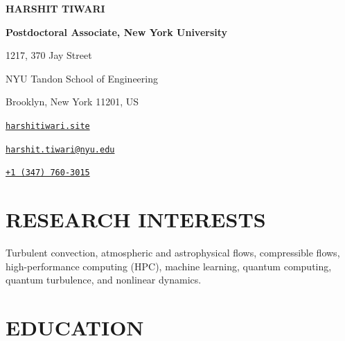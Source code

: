 \documentclass[10pt,a4paper]{article}
\begin{document}
\thispagestyle{firstpage}

\noindent
\begin{minipage}[b]{0.55\textwidth}
\setlength{\parindent}{0pt}%
{\Huge\bfseries\color{cvblue}HARSHIT TIWARI}\par
\vspace{0.5ex}
{\large\bfseries\color{cvblue}Postdoctoral Associate, New York University}\par
\vspace{1ex}
\textcolor{cvdark}{1217, 370 Jay Street}\par
\textcolor{cvdark}{NYU Tandon School of Engineering}\par
\textcolor{cvdark}{Brooklyn, New York 11201, US}
\end{minipage}%
\begin{minipage}[b]{0.45\textwidth}
\setlength{\parindent}{0pt}%
\raggedleft
\href{https://harshitiwari.site}{\texttt{harshitiwari.site} \textcolor{cvblue}{\faGlobe}}\par
\vspace{0.5ex}
\href{mailto:harshit.tiwari@nyu.edu}{\texttt{harshit.tiwari@nyu.edu} \textcolor{cvblue}{\faEnvelope}}\par
\vspace{0.5ex}
\href{tel:+13477603015}{\texttt{+1 (347) 760-3015} \textcolor{cvblue}{\faPhone}}\par
\vspace{1ex}
\href{https://scholar.google.com/citations?user=pZsezWMAAAAJ}{\textcolor{cvblue}{\Large\faGraduationCap}} \quad
\href{https://www.researchgate.net/profile/Harshit-Tiwari-7/}{\textcolor{cvblue}{\Large\faResearchgate}} \quad
\href{https://orcid.org/0009-0002-0116-9476}{\textcolor{cvblue}{\Large\faOrcid}} \quad
\href{https://www.linkedin.com/in/harshit-tiwari-6989b216b}{\textcolor{cvblue}{\Large\faLinkedin}}
\end{minipage}

\vspace{1ex}

\section{RESEARCH INTERESTS}
Turbulent convection, atmospheric and astrophysical flows, compressible flows, high-performance computing (HPC), machine learning, quantum computing, quantum turbulence, and nonlinear dynamics.

\section{EDUCATION}
\end{document}
